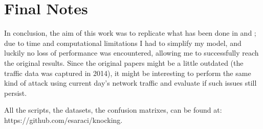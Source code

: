  \section{Final Notes}
 In conclusion, the aim of this work was to replicate what has been done in \cite{contiknocking} and \cite{contianalysis}; due to time and computational limitations I had to simplify my model, and luckily no loss of performance was encountered, allowing me to successfully reach the original results. Since the original papers might be a little outdated (the traffic data was captured in 2014), it might be interesting to perform the same kind of attack using current day's network traffic and evaluate if such issues still persist.
 
All the scripts, the datasets, the confusion matrixes, can be found at: https://github.com/esaraci/knocking.
